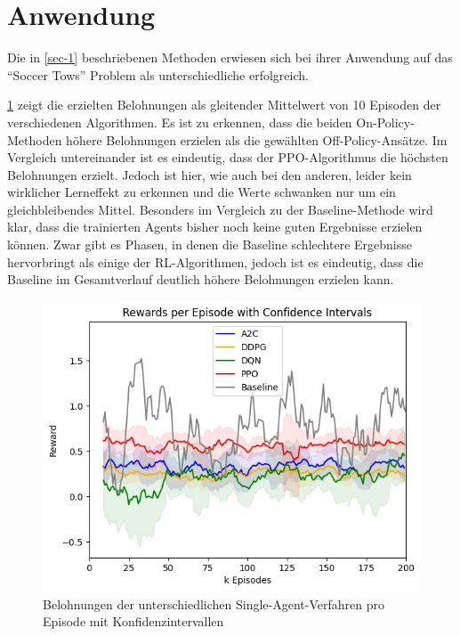 \documentclass[twocolumn]{webofc}
\begin{document}
\section{Anwendung} \label{sec-2}

Die in \ref{sec-1} beschriebenen Methoden erwiesen sich bei ihrer Anwendung auf das \enquote{Soccer Tows} Problem als unterschiedliche erfolgreich.


\ref{fig:bild1} zeigt die erzielten Belohnungen als gleitender Mittelwert von 10 Episoden der verschiedenen Algorithmen. Es ist zu erkennen, dass die beiden On-Policy-Methoden höhere Belohnungen erzielen als die gewählten Off-Policy-Ansätze. Im Vergleich untereinander ist es eindeutig, dass der \ac{PPO}-Algorithmus die höchsten Belohnungen erzielt. Jedoch ist hier, wie auch bei den anderen, leider kein wirklicher Lerneffekt zu erkennen und die Werte schwanken nur um ein gleichbleibendes Mittel.
Besonders im Vergleich zu der Baseline-Methode wird klar, dass die trainierten Agents bisher noch keine guten Ergebnisse erzielen können. Zwar gibt es Phasen, in denen die Baseline schlechtere Ergebnisse hervorbringt als einige der \ac{RL}-Algorithmen, jedoch ist es eindeutig, dass die Baseline im Gesamtverlauf deutlich höhere Belohnungen erzielen kann.

\begin{figure}[h]
	\centering
   \includegraphics[width=\columnwidth]{img/example1.jpeg}
	\caption{Belohnungen der unterschiedlichen Single-Agent-Verfahren pro Episode mit Konfidenzintervallen}
	\label{fig:bild1}
\end{figure}
\end{document}
